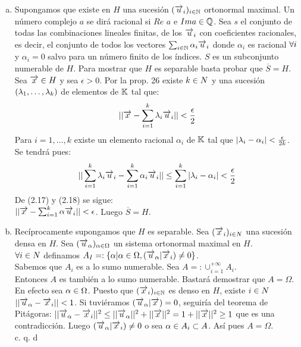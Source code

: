  \begin{enumerate}[a)]
 \item Supongamos que existe en $H$ una sucesión $(\overrightarrow{u}_i)_{i \in \mathbb{N}}$ ortonormal maximal. Un número complejo $a$ se dirá racional si $Re$ $a$ e $Im a \in \mathbb{Q}$. Sea $s$ el conjunto de todas las combinaciones lineales finitas, de los $\overrightarrow{u}_i$ con coeficientes racionales, es decir, el conjunto de todos los vectores $\sum_{i \in \mathbb{N}}\alpha_i \overrightarrow{u}_i$ donde $\alpha_i$ es racional $\forall i$ y $\alpha_i=0$ salvo para un número finito de los índices. $S$ es un subconjunto numerable de $H$. Para mostrar que $H$ es separable basta probar que $\overline{S}=H$. \\
 Sea $\overrightarrow{x} \in H$ y sea $\epsilon >0$. Por la prop. 26 existe $k \in N$ y una sucesión $(\lambda_1,\ldots, \lambda_k)$ de elementos de $\mathbb{K}$ tal que:
  \begin{equation}
  || \overrightarrow{x} - \sum_{i=1}^k \lambda_i \overrightarrow{u}_i || < \frac{\epsilon}{2}
  \end{equation}
 Para $i=1,\ldots, k$ existe un elemento racional $\alpha_i$ de $\mathbb{K}$ tal que $| \lambda_i - \alpha_i| < \frac{\epsilon}{2k}$. Se tendrá pues: 
\begin{equation}
  || \sum_{i=1}^k \lambda_i \overrightarrow{u}_i - \sum_{i=1}^k \alpha_i \overrightarrow{u}_i || \leq \sum_{i=1}^k | \lambda_i - \alpha_i | < \frac{\epsilon}{2}
\end{equation} 
De (2.17) y (2.18) se sigue: \\
$|| \overrightarrow{x} - \sum_{i=1}^k \alpha \overrightarrow{u}_i || < \epsilon$. Luego $\overline{S}=H$. 
 \item Recíprocamente supongamos que $H$ es separable. Sea $(\overrightarrow{x}_i)_{i\in N}$ una sucesión densa en $H$. Sea $(\overrightarrow{u}_\alpha)_{\alpha \in \Omega}$ un sistema ortonormal maximal en $H$. \\
 $\forall i \in N$ definamos $A_I=: \lbrace \alpha | \alpha \in \Omega, (\overrightarrow{u}_\alpha | \overrightarrow{x}_i) \neq 0 \rbrace$.\\
 Sabemos que $A_i$ es a lo sumo numerable. Sea $A=: \cup_{i=1}^{+\infty}A_i$. \\
 Entonces $A$ es también a lo sumo numerable. Bastará demostrar que $A= \Omega$.\\
 En efecto sea $\alpha \in \Omega$. Puesto que $(\overrightarrow{x}_i)_{i \in \mathbb{N}}$ es denso en $H$, existe $i \in N$ $|| \overrightarrow{u}_\alpha - \overrightarrow{x}_i || <1$. Si tuviéramos $(\overrightarrow{u}_\alpha | \overrightarrow{x} )=0$, seguiría del teorema de Pitágoras: $|| \overrightarrow{u}_\alpha - \overrightarrow{x}_i ||^2 \leq || \overrightarrow{u}_\alpha ||^2 + || \overrightarrow{x} || ^2=1 +|| \overrightarrow{x} ||^2 \geq 1$ que es una contradicción. Luego $(\overrightarrow{u}_\alpha | \overrightarrow{x}_i ) \neq 0$ o sea $\alpha \in A_i \subset A$.
 Así pues $A=\Omega$. \\
  \phantom{sssssssssssssssssssssssssssssssssss sasdasdasdasdadadssada} c. q. d \\ \\
 \end{enumerate}
